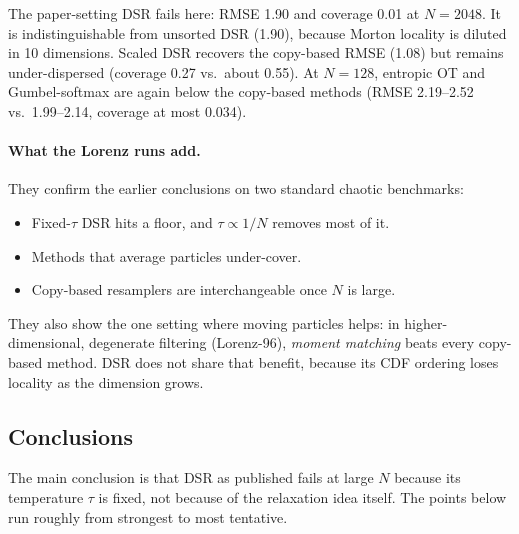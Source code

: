 The paper-setting DSR fails here: RMSE 1.90 and coverage 0.01 at $N{=}2048$. It is indistinguishable from unsorted DSR (1.90), because Morton locality is diluted in 10 dimensions. Scaled DSR recovers the copy-based RMSE (1.08) but remains under-dispersed (coverage 0.27 vs.\ about 0.55). At $N{=}128$, entropic OT and Gumbel-softmax are again below the copy-based methods (RMSE 2.19--2.52 vs.\ 1.99--2.14, coverage at most 0.034).

\paragraph{What the Lorenz runs add.}
They confirm the earlier conclusions on two standard chaotic benchmarks:
\begin{itemize}
\item Fixed-$\tau$ DSR hits a floor, and $\tau\propto1/N$ removes most of it.
\item Methods that average particles under-cover.
\item Copy-based resamplers are interchangeable once $N$ is large.
\end{itemize}
They also show the one setting where moving particles helps: in higher-dimensional, degenerate filtering (Lorenz-96), \emph{moment matching} beats every copy-based method. DSR does not share that benefit, because its CDF ordering loses locality as the dimension grows.

\subsection*{Conclusions}

The main conclusion is that DSR as published fails at large $N$ because its temperature $\tau$ is fixed, not because of the relaxation idea itself. The points below run roughly from strongest to most tentative.

